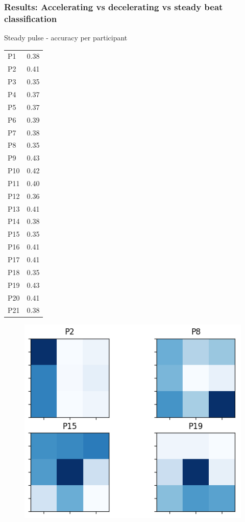 \documentclass{beamer}
\begin{document}
\begin{frame}
	\frametitle{Results: Accelerating vs decelerating vs steady beat classification}

	\begin{multicols}{2}
		Steady pulse - accuracy per participant
		\begin{tabular}{l|l}
			P1 & 0.38 \\
			P2 & 0.41 \\
			P3 & 0.35 \\
			P4 & 0.37 \\
			P5 & 0.37 \\
			P6 & 0.39 \\
			P7 & 0.38 \\
			P8 & 0.35 \\
			P9 & 0.43 \\
			P10 & 0.42 \\
			P11 & 0.40 \\
			P12 & 0.36 \\
			P13 & 0.41 \\
			P14 & 0.38 \\
			P15 & 0.35 \\
			P16 & 0.41 \\
			P17 & 0.41 \\
			P18 & 0.35 \\
			P19 & 0.43 \\
			P20 & 0.41 \\
			P21 & 0.38 \\
		\end{tabular}
		\columnbreak
		\begin{figure}
			\centering
			\includegraphics[scale=1.0]{fig17.png}
		\end{figure}

	\end{multicols}

\end{frame}
\end{document}
